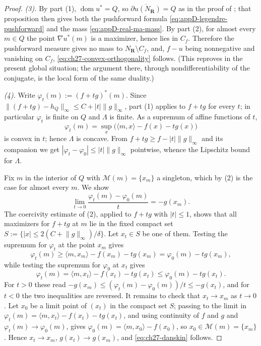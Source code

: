 \begin{proof}
\emph{(3).}  By part (1), \(\operatorname{dom}u^*=Q\), so
\(\overline{\partial u(N_{\mathbf R})}=Q\) as in the proof of
; that proposition then gives both the
pushforward formula \eqref{eq:appD-legendre-pushforward} and the mass
\eqref{eq:appD-real-ma-mass}.  By part (2), for almost every \(m\in Q\) the
point \(\nabla u^*(m)\) is a maximizer, hence lies in \(C_f\).  Therefore
the pushforward measure gives no mass to \(N_{\mathbf R}\setminus C_f\),
and, \(f-u\) being nonnegative and vanishing on \(C_f\),
\eqref{eq:ch27-convex-orthogonality} follows.  (This reproves
 in the present global
situation; the argument there, through nondifferentiability of the
conjugate, is the local form of the same duality.)

\emph{(4).}  Write \(\varphi_t(m):=(f+tg)^*(m)\).  Since
\(\lVert(f+tg)-h_Q\rVert_\infty\leq C+|t|\lVert g\rVert_\infty\), part (1)
applies to \(f+tg\) for every \(t\); in particular \(\varphi_t\) is finite on
\(Q\) and \(\Lambda\) is finite.  As a supremum of affine functions of
\(t\),
\[
 \varphi_t(m)=\sup_x\bigl(\langle m,x\rangle-f(x)-tg(x)\bigr)
\]
is convex in \(t\); hence \(\Lambda\) is concave.  From
\(f+tg\geq f-|t|\lVert g\rVert_\infty\) and its companion we get
\(|\varphi_t-\varphi_0|\leq|t|\lVert g\rVert_\infty\) pointwise, whence the
Lipschitz bound for \(\Lambda\).

Fix \(m\) in the interior of \(Q\) with \(\mathcal M(m)=\{x_m\}\) a
singleton, which by (2) is the case for almost every \(m\).  We show
\begin{equation}\label{eq:ch27-danskin}
 \lim_{t\to0}\frac{\varphi_t(m)-\varphi_0(m)}{t}=-g(x_m).
\end{equation}
The coercivity estimate of (2), applied to \(f+tg\) with
\(|t|\leq1\), shows that all maximizers for \(f+tg\) at \(m\) lie in the
fixed compact set
\(S:=\{|x|\leq2(C+\lVert g\rVert_\infty)/\delta\}\).  Let \(x_t\in S\) be
one of them.  Testing the supremum for \(\varphi_t\) at the point \(x_m\)
gives
\[
 \varphi_t(m)\geq\langle m,x_m\rangle-f(x_m)-tg(x_m)
 =\varphi_0(m)-tg(x_m),
\]
while testing the supremum for \(\varphi_0\) at \(x_t\) gives
\[
 \varphi_t(m)=\langle m,x_t\rangle-f(x_t)-tg(x_t)
 \leq\varphi_0(m)-tg(x_t).
\]
For \(t>0\) these read
\(-g(x_m)\leq(\varphi_t(m)-\varphi_0(m))/t\leq-g(x_t)\), and for \(t<0\) the
two inequalities are reversed.  It remains to check that \(x_t\to x_m\) as
\(t\to0\).  Let \(x_0\) be a limit point of \((x_t)\) in the compact set
\(S\); passing to the limit in
\(\varphi_t(m)=\langle m,x_t\rangle-f(x_t)-tg(x_t)\), and using continuity
of \(f\) and \(g\) and \(\varphi_t(m)\to\varphi_0(m)\), gives
\(\varphi_0(m)=\langle m,x_0\rangle-f(x_0)\), so \(x_0\in\mathcal M(m)=
\{x_m\}\).  Hence \(x_t\to x_m\), \(g(x_t)\to g(x_m)\), and
\eqref{eq:ch27-danskin} follows.


\end{proof}
